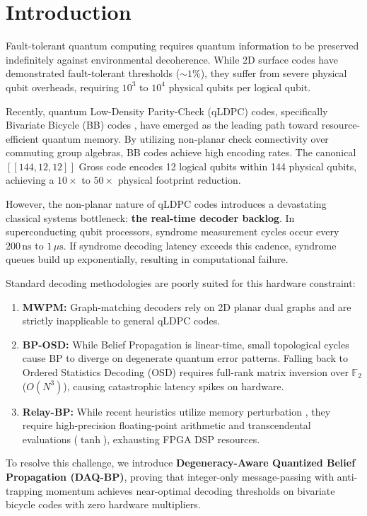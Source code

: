 \documentclass[aps,prxquantum,reprint,twocolumn,superscriptaddress,nofootinbib]{revtex4-2}
\begin{document}
\section{Introduction}
Fault-tolerant quantum computing requires quantum information to be preserved indefinitely against environmental decoherence. While 2D surface codes have demonstrated fault-tolerant thresholds ($\sim 1\%$), they suffer from severe physical qubit overheads, requiring $10^3$ to $10^4$ physical qubits per logical qubit.

Recently, quantum Low-Density Parity-Check (qLDPC) codes, specifically Bivariate Bicycle (BB) codes \cite{bravyi2024high}, have emerged as the leading path toward resource-efficient quantum memory. By utilizing non-planar check connectivity over commuting group algebras, BB codes achieve high encoding rates. The canonical $[[144, 12, 12]]$ Gross code encodes 12 logical qubits within 144 physical qubits, achieving a $10\times$ to $50\times$ physical footprint reduction.

However, the non-planar nature of qLDPC codes introduces a devastating classical systems bottleneck: \textbf{the real-time decoder backlog}. In superconducting qubit processors, syndrome measurement cycles occur every $200\,\text{ns}$ to $1\,\mu\text{s}$. If syndrome decoding latency exceeds this cadence, syndrome queues build up exponentially, resulting in computational failure.

Standard decoding methodologies are poorly suited for this hardware constraint:
\begin{enumerate}
    \item \textbf{MWPM:} Graph-matching decoders rely on 2D planar dual graphs and are strictly inapplicable to general qLDPC codes.
    \item \textbf{BP-OSD:} While Belief Propagation is linear-time, small topological cycles cause BP to diverge on degenerate quantum error patterns. Falling back to Ordered Statistics Decoding (OSD) requires full-rank matrix inversion over $\mathbb{F}_2$ ($O(N^3)$), causing catastrophic latency spikes on hardware.
    \item \textbf{Relay-BP:} While recent heuristics utilize memory perturbation \cite{muller2025improved}, they require high-precision floating-point arithmetic and transcendental evaluations ($\tanh$), exhausting FPGA DSP resources.
\end{enumerate}

To resolve this challenge, we introduce \textbf{Degeneracy-Aware Quantized Belief Propagation (DAQ-BP)}, proving that integer-only message-passing with anti-trapping momentum achieves near-optimal decoding thresholds on bivariate bicycle codes with zero hardware multipliers.
\end{document}
